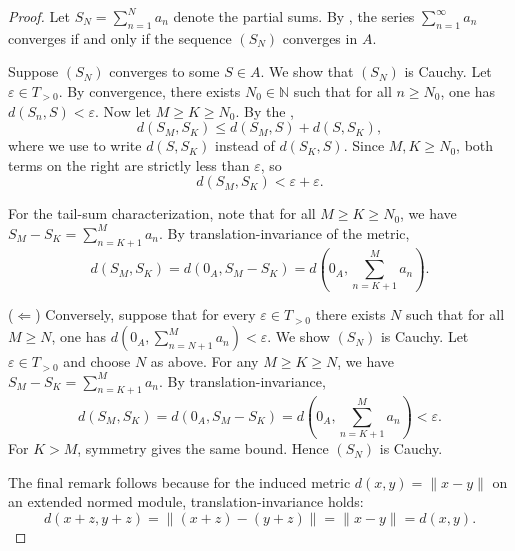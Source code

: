 \begin{proof}
    Let $S_N = \sum_{n=1}^N a_n$ denote the partial sums. By , the series $\sum_{n=1}^\infty a_n$ converges if and only if the sequence $(S_N)$ converges in $A$.

    Suppose $(S_N)$ converges to some $S \in A$. We show that $(S_N)$ is Cauchy. Let $\varepsilon \in T_{>0}$. By convergence, there exists $N_0 \in \mathbb{N}$ such that for all $n \geq N_0$, one has $d(S_n, S) < \varepsilon$. Now let $M \geq K \geq N_0$. By the ,
    $$d(S_M, S_K) \leq d(S_M, S) + d(S, S_K),$$
    where we use  to write $d(S, S_K)$ instead of $d(S_K, S)$. Since $M, K \geq N_0$, both terms on the right are strictly less than $\varepsilon$, so
    $$d(S_M, S_K) < \varepsilon + \varepsilon.$$

    For the tail-sum characterization, note that for all $M \geq K \geq N_0$, we have $S_M - S_K = \sum_{n=K+1}^M a_n$. By translation-invariance of the metric,
    $$d(S_M, S_K) = d(0_A, S_M - S_K) = d\left(0_A, \sum_{n=K+1}^M a_n\right).$$

    ($\Leftarrow$) Conversely, suppose that for every $\varepsilon \in T_{>0}$ there exists $N$ such that for all $M \geq N$, one has $d(0_A, \sum_{n=N+1}^M a_n) < \varepsilon$. We show $(S_N)$ is Cauchy. Let $\varepsilon \in T_{>0}$ and choose $N$ as above. For any $M \geq K \geq N$, we have $S_M - S_K = \sum_{n=K+1}^M a_n$. By translation-invariance,
    $$d(S_M, S_K) = d(0_A, S_M - S_K) = d\left(0_A, \sum_{n=K+1}^M a_n\right) < \varepsilon.$$
    For $K > M$, symmetry gives the same bound. Hence $(S_N)$ is Cauchy.

    The final remark follows because for the induced metric $d(x,y) = \|x-y\|$ on an extended normed module, translation-invariance holds:
    $$d(x+z, y+z) = \|(x+z) - (y+z)\| = \|x - y\| = d(x,y).$$
\end{proof}
